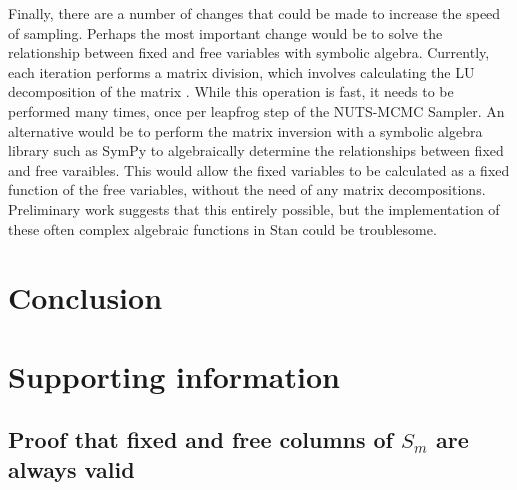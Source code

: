 \documentclass[10pt,letterpaper]{article}
\begin{document}
Finally, there are a number of changes that could be made to increase the speed of sampling.
Perhaps the most important change would be to solve the relationship between fixed and free variables with symbolic algebra.
Currently, each iteration performs a matrix division, which involves calculating the LU decomposition of the matrix \cite{stan_r_div}.
While this operation is fast, it needs to be performed many times, once per leapfrog step of the NUTS-MCMC Sampler.
An alternative would be to perform the matrix inversion with a symbolic algebra library such as SymPy \cite{sympy} to algebraically determine the relationships between fixed and free varaibles.
This would allow the fixed variables to be calculated as a fixed function of the free variables, without the need of any matrix decompositions.
Preliminary work suggests that this entirely possible, but the implementation of these often complex algebraic functions in Stan could be troublesome.



%


\section*{Conclusion}



\section*{Supporting information}

\subsection{Proof that fixed and free columns of $S_m$ are always valid}



\end{document}
